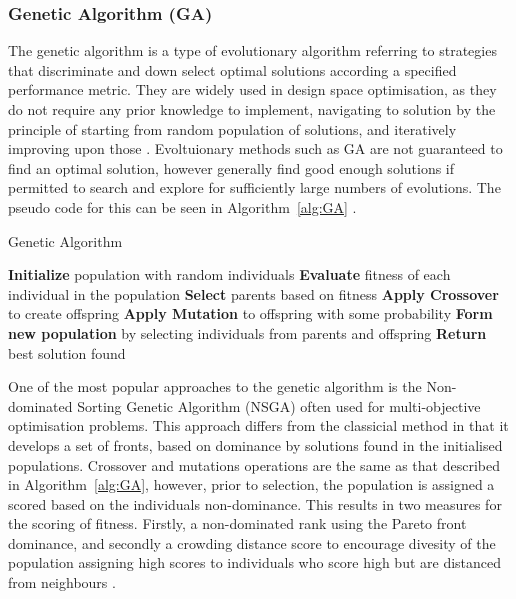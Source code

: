 \documentclass{article}
\begin{document}
\subsubsection{Genetic Algorithm (GA)}\label{GA}
The genetic algorithm is a type of evolutionary algorithm referring to strategies that discriminate and down select optimal solutions according a specified performance metric. They are widely used in design space optimisation, as they do not require any prior knowledge to implement, navigating to solution by the principle of starting from random population of solutions, and iteratively improving upon those \citep{Panerati2016}. Evoltuionary methods such as GA are not guaranteed to find an optimal solution, however generally find good enough solutions if permitted to search and explore for sufficiently large numbers of evolutions. The pseudo code for this can be seen in Algorithm~\ref{alg:GA} \citep{Sivanandam2008}.

\begin{algorithm}
\caption{Genetic Algorithm}
\begin{algorithmic}[1]
\label{alg:GA}
\STATE \textbf{Initialize} population with random individuals
    \STATE \textbf{Evaluate} fitness of each individual in the population
    \STATE \textbf{Select} parents based on fitness
    \STATE \textbf{Apply Crossover} to create offspring
    \STATE \textbf{Apply Mutation} to offspring with some probability
    \STATE \textbf{Form new population} by selecting individuals from parents and offspring
\ENDWHILE
\STATE \textbf{Return} best solution found
\end{algorithmic}
\end{algorithm}

One of the most popular approaches to the genetic algorithm is the Non-dominated Sorting Genetic Algorithm (NSGA) often used for multi-objective optimisation problems. This approach differs from the classicial method in that it develops a set of fronts, based on dominance by solutions found in the initialised populations. Crossover and mutations operations are the same as that described in Algorithm~\ref{alg:GA}, however, prior to selection, the population is assigned a scored based on the individuals non-dominance. This results in two measures for the scoring of fitness. Firstly, a non-dominated rank using the Pareto front dominance, and secondly a crowding distance score to encourage divesity of the population assigning high scores to individuals who score high but are distanced from neighbours \citep{SrinivasN1994}.
\end{document}
